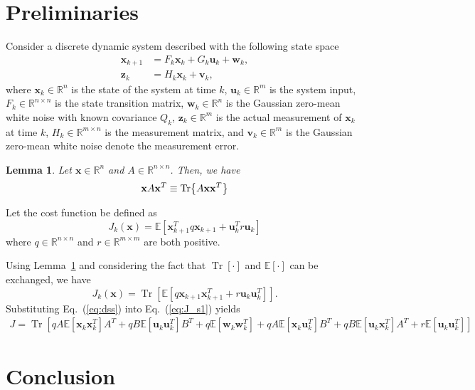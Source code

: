\documentclass[letterpaper, 10 pt, conference]{ieeeconf} %
\def \bx{\mathbf x}
\def \bz{\mathbf z}
\def \bu{\mathbf u}
\def \bv{\mathbf v}
\def \bw{\mathbf w}
\newcommand{\TR}[1]{\operatorname{Tr}\left[#1\right]}
\newcommand{\EX}[1]{\mathbb{E}\left[#1\right]}
\newtheorem{lem}{Lemma}[section]
\begin{document}
\section{Preliminaries}\label{sec:pre}
Consider a discrete dynamic system described with the following state space
\begin{equation}\label{eq:dss}
	\begin{array}{ll}
		\bx_{k+1}&=F_{k} \bx_{k}+G_k\bu_k+\bw_{k}, \\
		\bz_{k}&=H_{k}  \bx_{k}+\bv_{k},
	\end{array}
\end{equation}
where $ \bx_k \in \mathbb{R}^n $ is the state of the system at time $k$, $\bu_{k} \in \mathbb{R}^m $ is the system input, $F_{k}\in \mathbb{R}^{n\times n}$  is the state transition matrix, $\bw_{k}\in \mathbb{R}^{n}$ is the Gaussian zero-mean white noise with known covariance $ Q_k $, $\bz_{k}\in \mathbb{R}^{m}$ is the actual measurement of $ \bx_k$ at time $k$, $H_{k}\in \mathbb{R}^{m\times n}$ is the measurement matrix, and $\bv_{k}\in \mathbb{R}^{m}$ is the Gaussian zero-mean white noise denote the measurement error. 

\begin{lem}\label{lem:trace}
	Let $ \bx \in \mathbb{R}^n $ and $A\in \mathbb{R}^{n\times n}$. Then, we have
	\begin{equation*}\label{key}
		\bx A \bx^T \equiv \Tr{A\bx\bx^T }
	\end{equation*}
\end{lem}


Let the cost function be defined as 
\begin{equation}\label{eq:J}
	J_k(\bx)=\EX{\bx_{k+1}^T q \bx_{k+1}+\bu_k^T r \bu_k}
\end{equation}
where $ q \in \mathbb{R}^{n \times n} $ and $ r  \in \mathbb{R}^{m \times m}$ are both positive.

Using Lemma~\ref{lem:trace} and considering the fact that $ \TR{\cdot} $ and $ \EX{\cdot} $ can be exchanged, we have
\begin{equation}\label{eq:J_s1}
	J_k(\bx)=\TR{\EX{q \bx_{k+1} \bx_{k+1}^T+r \bu_k \bu_k^T}}.
\end{equation}
Substituting Eq.~(\ref{eq:dss}) into Eq.~(\ref{eq:J_s1}) yields
\begin{equation}\label{key}
	\begin{gathered}
		J=\TR{q A \EX{\bx_k \bx_k^T} A^T+qB \EX{\bu_k \bu_k^T} B^T+q\EX{\bw_k \bw_k^T}+qA \EX{\bx_k \bu_k^T} B^T+qB \EX{\bu_k \bx_k^T} A^T+r \EX{\bu_k \bu_k^T}}
	\end{gathered}
\end{equation}

\section{Conclusion}\label{sec:con}



\end{document}

